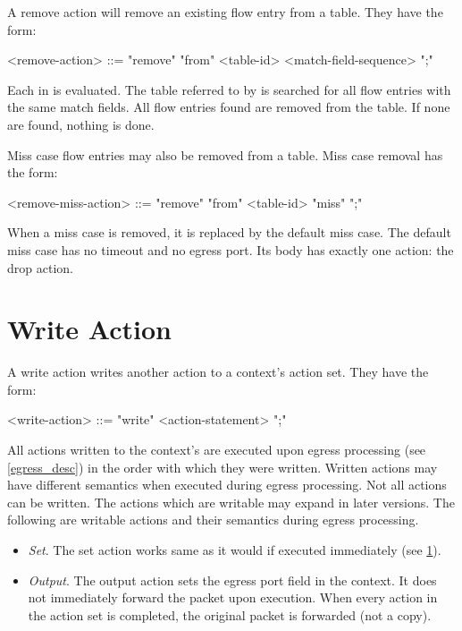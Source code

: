 A remove action will remove an existing flow entry from a table. They have the form:

\begin{minip}
\begin{grammar}
<remove-action> ::= "remove" "from" <table-id> <match-field-sequence> ";"
\end{grammar}
\end{minip}

Each  in  is evaluated. The table referred to by  is searched for all flow entries with the same match fields. All flow entries found are removed from the table. If none are found, nothing is done.

Miss case flow entries may also be removed from a table. Miss case removal has the form: 

\begin{minip}
\begin{grammar}
<remove-miss-action> ::= "remove" "from" <table-id> "miss" ";"
\end{grammar}
\end{minip}

When a miss case is removed, it is replaced by the default miss case. The default miss case has no timeout and no egress port. Its body has exactly one action: the drop action.

\section{Write Action} \label{guide:write}

A write action writes another action to a context's action set. They have the form:

\begin{minip}
\begin{grammar}
<write-action> ::= "write" <action-statement> ";"
\end{grammar}
\end{minip}

All actions written to the context's are executed upon egress processing (see \ref{egress_desc}) in the order with which they were written. Written actions may have different semantics when executed during egress processing. Not all actions can be written. The actions which are writable may expand in later versions. The following are writable actions and their semantics during egress processing.

\begin{itemize}
\item \textit{Set}. The set action works same as it would if executed immediately (see \ref{guide:write}). 

\item \textit{Output}. The output action sets the egress port field in the context. It does not immediately forward the packet upon execution. When every action in the action set is completed, the original packet is forwarded (not a copy).
\end{itemize}

